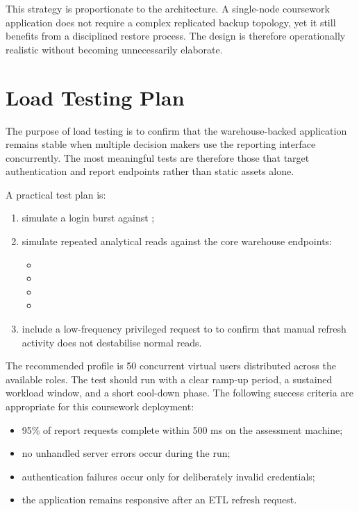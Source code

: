 \documentclass[12pt,a4paper]{article}
\begin{document}
This strategy is proportionate to the architecture. A single-node coursework application does not require a complex replicated backup topology, yet it still benefits from a disciplined restore process. The design is therefore operationally realistic without becoming unnecessarily elaborate.

\section{Load Testing Plan}
The purpose of load testing is to confirm that the warehouse-backed application remains stable when multiple decision makers use the reporting interface concurrently. The most meaningful tests are therefore those that target authentication and report endpoints rather than static assets alone.

A practical test plan is:
\begin{enumerate}
  \item simulate a login burst against ;
  \item simulate repeated analytical reads against the core warehouse endpoints:
  \begin{itemize}
    \item {}
    \item {}
    \item {}
    \item {}
  \end{itemize}
  \item include a low-frequency privileged request to  to confirm that manual refresh activity does not destabilise normal reads.
\end{enumerate}

The recommended profile is 50 concurrent virtual users distributed across the available roles. The test should run with a clear ramp-up period, a sustained workload window, and a short cool-down phase. The following success criteria are appropriate for this coursework deployment:
\begin{itemize}
  \item 95\% of report requests complete within 500 ms on the assessment machine;
  \item no unhandled server errors occur during the run;
  \item authentication failures occur only for deliberately invalid credentials;
  \item the application remains responsive after an ETL refresh request.
\end{itemize}
\end{document}
